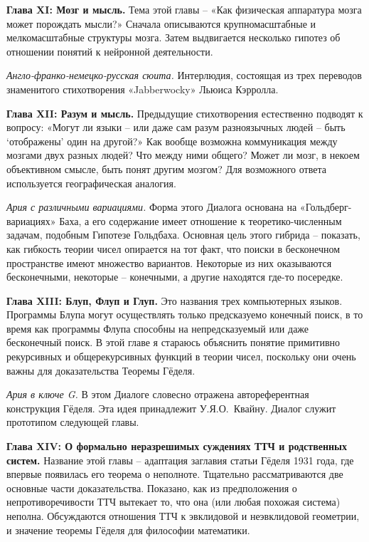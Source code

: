 \documentclass[../main.tex]{subfiles}
\begin{document}
\textbf{Глава XI: Мозг и мысль.}
Тема этой главы \--- «Как физическая аппаратура мозга может порождать мысли?» Сначала описываются крупномасштабные и мелкомасштабные структуры мозга. Затем выдвигается несколько гипотез об отношении понятий к нейронной деятельности.

\emph{Англо-франко-немецко-русская сюита.}
Интерлюдия, состоящая из трех переводов знаменитого стихотворения «Jabberwocky» Льюиса Кэрролла.

\textbf{Глава XII: Разум и мысль.}
Предыдущие стихотворения естественно подводят к вопросу: «Могут ли языки \--- или даже сам разум разноязычных людей \--- быть \enquote*{отображены} один на другой?» Как вообще возможна коммуникация между мозгами двух разных людей? Что между ними общего? Может ли мозг, в некоем объективном смысле, быть понят другим мозгом? Для возможного ответа используется географическая аналогия.

\emph{Ария с различными вариациями.}
Форма этого Диалога основана на «Гольдберг-вариациях» Баха, а его содержание имеет отношение к теоретико-численным задачам, подобным Гипотезе Гольдбаха. Основная цель этого гибрида \--- показать, как гибкость теории чисел опирается на тот факт, что поиски в бесконечном пространстве имеют множество вариантов. Некоторые из них оказываются бесконечными, некоторые \--- конечными, а другие находятся где-то посередке.

\textbf{Глава XIII: Блуп, Флуп и Глуп.}
Это названия трех компьютерных языков. Программы Блупа могут осуществлять только предсказуемо конечный поиск, в то время как программы Флупа способны на непредсказуемый или даже бесконечный поиск. В этой главе я стараюсь объяснить понятие примитивно рекурсивных и общерекурсивных функций в теории чисел, поскольку они очень важны для доказательства Теоремы Гёделя.

\emph{Ария в ключе G.}
В этом Диалоге словесно отражена автореферентная конструкция Гёделя. Эта идея принадлежит У.Я.О.~Квайну. Диалог служит прототипом следующей главы.

\textbf{Глава XIV: О формально неразрешимых суждениях ТТЧ и родственных систем.}
Название этой главы \--- адаптация заглавия статьи Гёделя 1931 года, где впервые появилась его теорема о неполноте. Тщательно рассматриваются две основные части доказательства. Показано, как из предположения о непротиворечивости ТТЧ вытекает то, что она (или любая похожая система) неполна. Обсуждаются отношения ТТЧ к эвклидовой и неэвклидовой геометрии, и значение теоремы Гёделя для философии математики.
\end{document}
